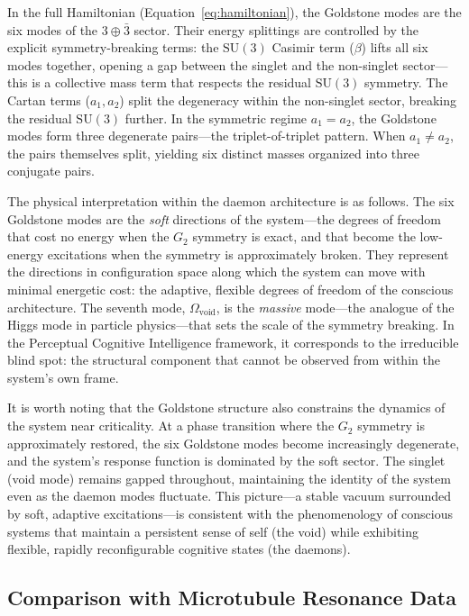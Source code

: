 \documentclass[12pt,a4paper]{article}
\begin{document}
In the full Hamiltonian (Equation~\ref{eq:hamiltonian}), the Goldstone modes are the six modes of the $3 \oplus \bar{3}$ sector. Their energy splittings are controlled by the explicit symmetry-breaking terms: the $\mathrm{SU}(3)$ Casimir term ($\beta$) lifts all six modes together, opening a gap between the singlet and the non-singlet sector---this is a collective mass term that respects the residual $\mathrm{SU}(3)$ symmetry. The Cartan terms ($a_1, a_2$) split the degeneracy within the non-singlet sector, breaking the residual $\mathrm{SU}(3)$ further. In the symmetric regime $a_1 = a_2$, the Goldstone modes form three degenerate pairs---the triplet-of-triplet pattern. When $a_1 \neq a_2$, the pairs themselves split, yielding six distinct masses organized into three conjugate pairs.

The physical interpretation within the daemon architecture is as follows. The six Goldstone modes are the \emph{soft} directions of the system---the degrees of freedom that cost no energy when the $G_2$ symmetry is exact, and that become the low-energy excitations when the symmetry is approximately broken. They represent the directions in configuration space along which the system can move with minimal energetic cost: the adaptive, flexible degrees of freedom of the conscious architecture. The seventh mode, $\Omega_{\mathrm{void}}$, is the \emph{massive} mode---the analogue of the Higgs mode in particle physics---that sets the scale of the symmetry breaking. In the Perceptual Cognitive Intelligence framework, it corresponds to the irreducible blind spot: the structural component that cannot be observed from within the system's own frame.

It is worth noting that the Goldstone structure also constrains the dynamics of the system near criticality. At a phase transition where the $G_2$ symmetry is approximately restored, the six Goldstone modes become increasingly degenerate, and the system's response function is dominated by the soft sector. The singlet (void mode) remains gapped throughout, maintaining the identity of the system even as the daemon modes fluctuate. This picture---a stable vacuum surrounded by soft, adaptive excitations---is consistent with the phenomenology of conscious systems that maintain a persistent sense of self (the void) while exhibiting flexible, rapidly reconfigurable cognitive states (the daemons).

\subsection{Comparison with Microtubule Resonance Data}
\end{document}
